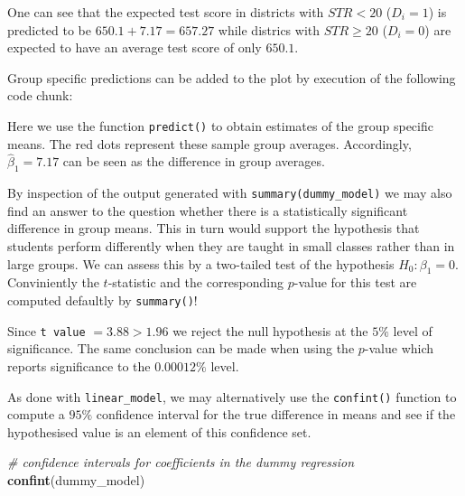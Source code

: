 \documentclass[]{book}
\newenvironment{Shaded}{\begin{snugshade}}{\end{snugshade}}
\newcommand{\KeywordTok}[1]{\textcolor[rgb]{0.13,0.29,0.53}{\textbf{#1}}}
\newcommand{\DataTypeTok}[1]{\textcolor[rgb]{0.13,0.29,0.53}{#1}}
\newcommand{\DecValTok}[1]{\textcolor[rgb]{0.00,0.00,0.81}{#1}}
\newcommand{\StringTok}[1]{\textcolor[rgb]{0.31,0.60,0.02}{#1}}
\newcommand{\CommentTok}[1]{\textcolor[rgb]{0.56,0.35,0.01}{\textit{#1}}}
\newcommand{\OperatorTok}[1]{\textcolor[rgb]{0.81,0.36,0.00}{\textbf{#1}}}
\newcommand{\NormalTok}[1]{#1}
\theoremstyle{definition}
\theoremstyle{definition}
\theoremstyle{definition}
\theoremstyle{remark}
\begin{document}
One can see that the expected test score in districts with \(STR < 20\)
(\(D_i = 1\)) is predicted to be \(650.1 + 7.17 = 657.27\) while
districs with \(STR \geq 20\) (\(D_i = 0\)) are expected to have an
average test score of only \(650.1\).

Group specific predictions can be added to the plot by execution of the
following code chunk:

\begin{Shaded}
\end{Shaded}

Here we use the function \texttt{predict()} to obtain estimates of the
group specific means. The red dots represent these sample group
averages. Accordingly, \(\hat{\beta}_1 = 7.17\) can be seen as the
difference in group averages.

By inspection of the output generated with
\texttt{summary(dummy\_model)} we may also find an answer to the
question whether there is a statistically significant difference in
group means. This in turn would support the hypothesis that students
perform differently when they are taught in small classes rather than in
large groups. We can assess this by a two-tailed test of the hypothesis
\(H_0: \beta_1 = 0\). Conviniently the \(t\)-statistic and the
corresponding \(p\)-value for this test are computed defaultly by
\texttt{summary()}!

Since \texttt{t\ value} \(= 3.88 > 1.96\) we reject the null hypothesis
at the \(5\%\) level of significance. The same conclusion can be made
when using the \(p\)-value which reports significance to the
\(0.00012\%\) level.

As done with \texttt{linear\_model}, we may alternatively use the
\texttt{confint()} function to compute a \(95\%\) confidence interval
for the true difference in means and see if the hypothesised value is an
element of this confidence set.

\begin{Shaded}
\begin{Highlighting}[]
\CommentTok{# confidence intervals for coefficients in the dummy regression}
\KeywordTok{confint}\NormalTok{(dummy_model)}
\end{Highlighting}
\end{Shaded}
\end{document}
